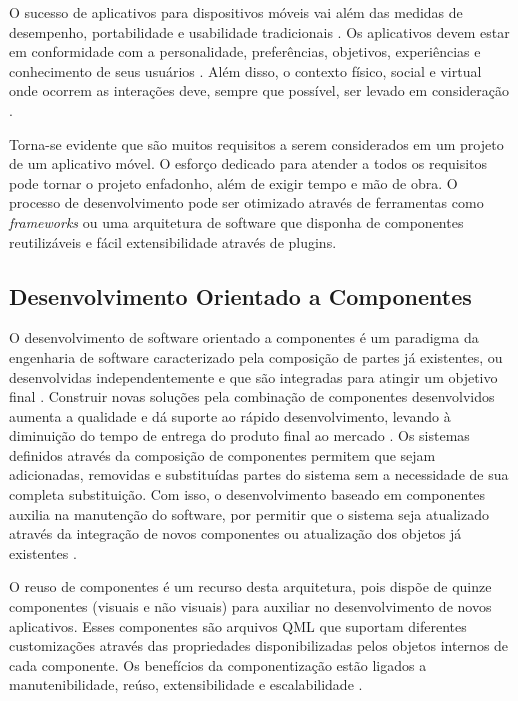 O sucesso de aplicativos para dispositivos móveis vai além das medidas de desempenho, portabilidade e usabilidade tradicionais \cite{Kronbauer:2012:UEE:2393536.2393582}. Os aplicativos devem estar em conformidade com a personalidade, preferências, objetivos, experiências e conhecimento de seus usuários \cite{Vermeeren:2010:UEE:1868914.1868973}. Além disso, o contexto físico, social e virtual onde ocorrem as interações deve, sempre que possível, ser levado em consideração \cite{McCarthy:2004:TE:1015530.1015549}.\par

Torna-se evidente que são muitos requisitos a serem considerados em um projeto de um aplicativo móvel. O esforço dedicado para atender a todos os requisitos pode tornar o projeto enfadonho, além de exigir tempo e mão de obra. O processo de desenvolvimento pode ser otimizado através de ferramentas como \textit{frameworks} ou uma arquitetura de software que disponha de componentes reutilizáveis e fácil extensibilidade através de plugins.


\subsection{Desenvolvimento Orientado a Componentes}
O desenvolvimento de software orientado a componentes é um paradigma da engenharia de software caracterizado pela composição de partes já existentes, ou desenvolvidas independentemente e que são integradas para atingir um objetivo final \cite{rafael_heider}. Construir novas soluções pela combinação de componentes desenvolvidos aumenta a qualidade e dá suporte ao rápido desenvolvimento, levando à diminuição do tempo de entrega do produto final ao mercado \cite{rafael_heider}. Os sistemas definidos através da composição de componentes permitem que sejam adicionadas, removidas e substituídas partes do sistema sem a necessidade de sua completa substituição. Com isso, o desenvolvimento baseado em componentes auxilia na manutenção do software, por permitir que o sistema seja atualizado através da integração de novos componentes ou atualização dos objetos já existentes \cite{szyperski_bosch_weck_1999}.\par

O reuso de componentes é um recurso desta arquitetura, pois dispõe de quinze componentes (visuais e não visuais) para auxiliar no desenvolvimento de novos aplicativos. Esses componentes são arquivos QML que suportam diferentes customizações através das propriedades disponibilizadas pelos objetos internos de cada componente. Os benefícios da componentização estão ligados a manutenibilidade, reúso, extensibilidade e escalabilidade \cite{D'Souza:1998:OCF:291139}.


